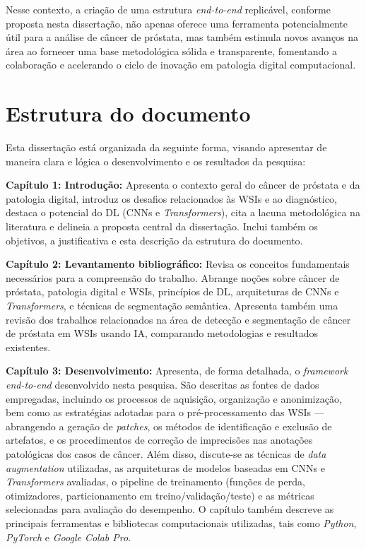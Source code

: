 Nesse contexto, a criação de uma estrutura \textit{end-to-end} replicável, conforme proposta nesta dissertação, não apenas oferece uma ferramenta potencialmente útil para a análise de câncer de próstata, mas também estimula novos avanços na área ao fornecer uma base metodológica sólida e transparente, fomentando a colaboração e acelerando o ciclo de inovação em patologia digital computacional.

\section{Estrutura do documento}\label{sec:estrutura_documento}
Esta dissertação está organizada da seguinte forma, visando apresentar de maneira clara e lógica o desenvolvimento e os resultados da pesquisa:

\textbf{Capítulo 1: Introdução:} Apresenta o contexto geral do câncer de próstata e da patologia digital, introduz os desafios relacionados às WSIs e ao diagnóstico, destaca o potencial do DL (CNNs e \textit{Transformers}), cita a lacuna metodológica na literatura e delineia a proposta central da dissertação. Inclui também os objetivos, a justificativa e esta descrição da estrutura do documento.

\textbf{Capítulo 2: Levantamento bibliográfico:} Revisa os conceitos fundamentais necessários para a compreensão do trabalho. Abrange noções sobre câncer de próstata, patologia digital e WSIs, princípios de DL, arquiteturas de CNNs e \textit{Transformers}, e técnicas de segmentação semântica. Apresenta também uma revisão dos trabalhos relacionados na área de detecção e segmentação de câncer de próstata em WSIs usando IA, comparando metodologias e resultados existentes.

\textbf{Capítulo 3: Desenvolvimento:} Apresenta, de forma detalhada, o \textit{framework} \textit{end-to-end} desenvolvido nesta pesquisa. São descritas as fontes de dados empregadas, incluindo os processos de aquisição, organização e anonimização, bem como as estratégias adotadas para o pré-processamento das WSIs — abrangendo a geração de \textit{patches}, os métodos de identificação e exclusão de artefatos, e os procedimentos de correção de imprecisões nas anotações patológicas dos casos de câncer. Além disso, discute-se as técnicas de \textit{data augmentation} utilizadas, as arquiteturas de modelos baseadas em CNNs e \textit{Transformers} avaliadas, o pipeline de treinamento (funções de perda, otimizadores, particionamento em treino/validação/teste) e as métricas selecionadas para avaliação do desempenho. O capítulo também descreve as principais ferramentas e bibliotecas computacionais utilizadas, tais como \textit{Python}, \textit{PyTorch} e \textit{Google Colab Pro}.


